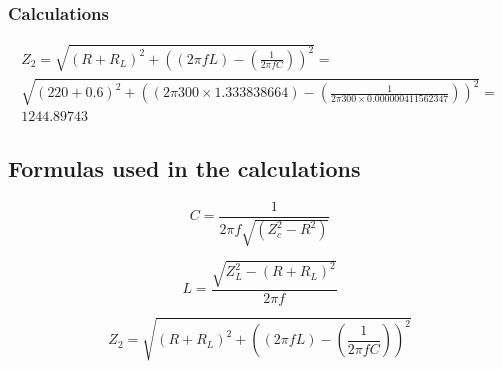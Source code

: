    \subsubsection*{Calculations}
\begin{multline}
	Z_2 = \sqrt{(R+R_L)^2 + \left(\left(2 \pi f L\right) - \left(\frac{1}{2 \pi f C}\right)\right)^2} = \\
	\sqrt{(220+0.6)^2 + \left(\left(2 \pi 300 \times 1.333838664\right) - \left(\frac{1}{2 \pi 300 \times 0.000000411562347}\right)\right)^2}= \\
	1244.89743
\end{multline}
    


\subsection*{Formulas used in the calculations}


\begin{equation}
C = \frac{1}{2\pi f \sqrt{(Z_c^2 - R^2)}}
\end{equation}

\begin{equation}
	L = \frac{\sqrt{Z_L^2-(R+R_L)^2}}{2\pi f}
\end{equation}

\begin{equation}
	Z_2 = \sqrt{(R+R_L)^2 + \left(\left(2 \pi f L\right) - \left(\frac{1}{2 \pi f C}\right)\right)^2}
\end{equation}
